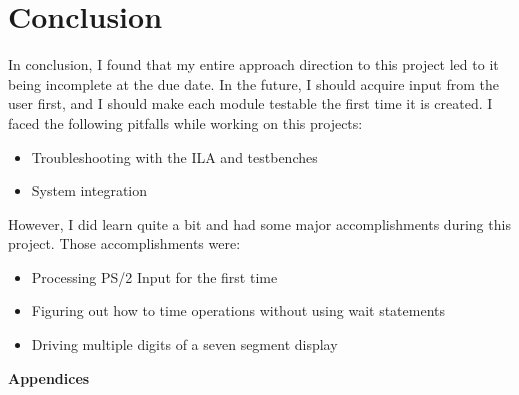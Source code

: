 \documentclass[11pt]{article}
\begin{document}
\section{Conclusion}

In conclusion, I found that my entire approach direction to this project led to it being incomplete at the due date. In the future, I should acquire input from the user first, and I should make each module testable the first time it is created. I faced the following pitfalls while working on this projects:

\begin{itemize}
	\item Troubleshooting with the ILA and testbenches
	\item System integration
\end{itemize}

However, I did learn quite a bit and had some major accomplishments during this project. Those accomplishments were:

\begin{itemize}
	\item Processing PS/2 Input for the first time
	\item Figuring out how to time operations without using wait statements
	\item Driving multiple digits of a seven segment display
\end{itemize}

\pagebreak

\textbf{Appendices}
\end{document}
